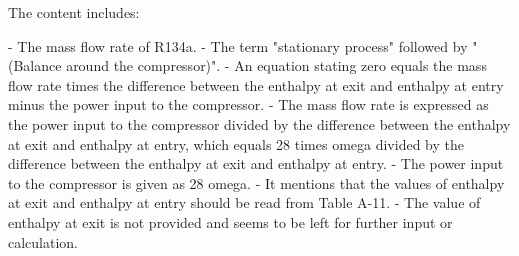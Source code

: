 The content includes:

- The mass flow rate of R134a.
- The term "stationary process" followed by "(Balance around the compressor)".
- An equation stating zero equals the mass flow rate times the difference between the enthalpy at exit and enthalpy at entry minus the power input to the compressor.
- The mass flow rate is expressed as the power input to the compressor divided by the difference between the enthalpy at exit and enthalpy at entry, which equals 28 times omega divided by the difference between the enthalpy at exit and enthalpy at entry.
- The power input to the compressor is given as 28 omega.
- It mentions that the values of enthalpy at exit and enthalpy at entry should be read from Table A-11.
- The value of enthalpy at exit is not provided and seems to be left for further input or calculation.